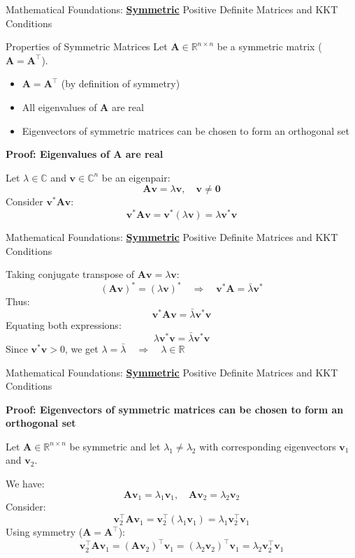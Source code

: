 \documentclass{beamer}
\begin{document}
\begin{frame}{Mathematical Foundations: \textbf{\underline{Symmetric}} Positive Definite Matrices and KKT Conditions}

\begin{block}{Properties of Symmetric Matrices}
    Let $\bm{A} \in \mathbb{R}^{n \times n}$ be a symmetric matrix ($\bm{A} = \bm{A}^{\top}$).
    
    \begin{itemize}
        \item $\bm{A} = \bm{A}^{\top}$ (by definition of symmetry)
        \item All eigenvalues of $\bm{A}$ are real
        \item Eigenvectors of symmetric matrices can be chosen to form an orthogonal set
    \end{itemize}
\end{block}

\vspace{0.3cm}

\textbf{Proof: Eigenvalues of $\bm{A}$ are real}  

Let $\lambda \in \mathbb{C}$ and $\bm{v} \in \mathbb{C}^n$ be an eigenpair:
\[
\bm{A}\bm{v} = \lambda \bm{v}, \quad \bm{v} \neq \bm{0}
\]
Consider $\bm{v}^* \bm{A} \bm{v}$:
\[
\bm{v}^* \bm{A} \bm{v} = \bm{v}^* (\lambda \bm{v}) = \lambda \bm{v}^* \bm{v}
\]

\end{frame}

\begin{frame}{Mathematical Foundations: \textbf{\underline{Symmetric}} Positive Definite Matrices and KKT Conditions}

Taking conjugate transpose of $\bm{A}\bm{v} = \lambda \bm{v}$:
\[
(\bm{A}\bm{v})^* = (\lambda \bm{v})^* \quad \Rightarrow \quad \bm{v}^* \bm{A} = \bar{\lambda} \bm{v}^*
\]
Thus:
\[
\bm{v}^* \bm{A} \bm{v} = \bar{\lambda} \bm{v}^* \bm{v}
\]
Equating both expressions:
\[
\lambda \bm{v}^* \bm{v} = \bar{\lambda} \bm{v}^* \bm{v}
\]
Since $\bm{v}^* \bm{v} > 0$, we get $\boxed{\lambda = \bar{\lambda} \quad \Rightarrow \quad \lambda \in \mathbb{R}}$


\end{frame}

\begin{frame}{Mathematical Foundations: \textbf{\underline{Symmetric}} Positive Definite Matrices and KKT Conditions}

\textbf{Proof: Eigenvectors of symmetric matrices can be chosen to form an orthogonal set}

Let $\bm{A} \in \mathbb{R}^{n \times n}$ be symmetric and let $\lambda_1 \neq \lambda_2$ with corresponding eigenvectors $\bm{v}_1$ and $\bm{v}_2$.

We have:
\[
\bm{A}\bm{v}_1 = \lambda_1 \bm{v}_1, \quad \bm{A}\bm{v}_2 = \lambda_2 \bm{v}_2
\]
Consider:
\[
\bm{v}_2^{\top} \bm{A} \bm{v}_1 = \bm{v}_2^{\top} (\lambda_1 \bm{v}_1) = \lambda_1 \bm{v}_2^{\top} \bm{v}_1
\]
Using symmetry ($\bm{A} = \bm{A}^{\top}$):
\[
\bm{v}_2^{\top} \bm{A} \bm{v}_1 = (\bm{A} \bm{v}_2)^{\top} \bm{v}_1 = (\lambda_2 \bm{v}_2)^{\top} \bm{v}_1 = \lambda_2 \bm{v}_2^{\top} \bm{v}_1
\]

\end{frame}
\end{document}
